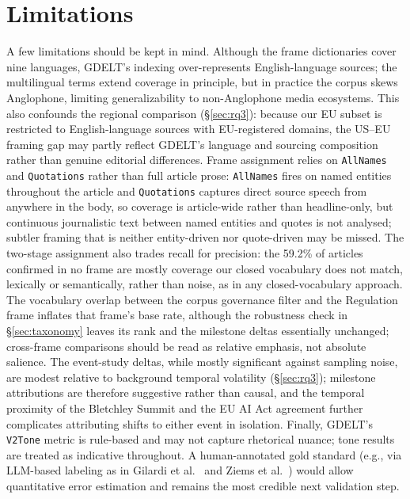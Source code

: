 \documentclass[sigconf]{acmart}
\begin{document}
\section{Limitations}
\label{sec:limitations}

A few limitations should be kept in mind.
Although the frame dictionaries cover nine languages, GDELT's indexing over-represents English-language sources; the multilingual terms extend coverage in principle, but in practice the corpus skews Anglophone, limiting generalizability to non-Anglophone media ecosystems.
This also confounds the regional comparison (\S\ref{sec:rq3}): because our EU subset is restricted to English-language sources with EU-registered domains, the US--EU framing gap may partly reflect GDELT's language and sourcing composition rather than genuine editorial differences.
Frame assignment relies on \texttt{AllNames} and \texttt{Quotations} rather than full article prose: \texttt{AllNames} fires on named entities throughout the article and \texttt{Quotations} captures direct source speech from anywhere in the body, so coverage is article-wide rather than headline-only, but continuous journalistic text between named entities and quotes is not analysed; subtler framing that is neither entity-driven nor quote-driven may be missed.
The two-stage assignment also trades recall for precision: the 59.2\% of articles confirmed in no frame are mostly coverage our closed vocabulary does not match, lexically or semantically, rather than noise, as in any closed-vocabulary approach.
The vocabulary overlap between the corpus governance filter and the Regulation frame inflates that frame's base rate, although the robustness check in \S\ref{sec:taxonomy} leaves its rank and the milestone deltas essentially unchanged; cross-frame comparisons should be read as relative emphasis, not absolute salience.
The event-study deltas, while mostly significant against sampling noise, are modest relative to background temporal volatility (\S\ref{sec:rq3}); milestone attributions are therefore suggestive rather than causal, and the temporal proximity of the Bletchley Summit and the EU AI Act agreement further complicates attributing shifts to either event in isolation.
Finally, GDELT's \texttt{V2Tone} metric is rule-based and may not capture rhetorical nuance; tone results are treated as indicative throughout.
A human-annotated gold standard (e.g., via LLM-based labeling as in Gilardi et al.~\cite{gilardi_chatgpt_2023} and Ziems et al.~\cite{ziems_can_2024}) would allow quantitative error estimation and remains the most credible next validation step.
\end{document}
